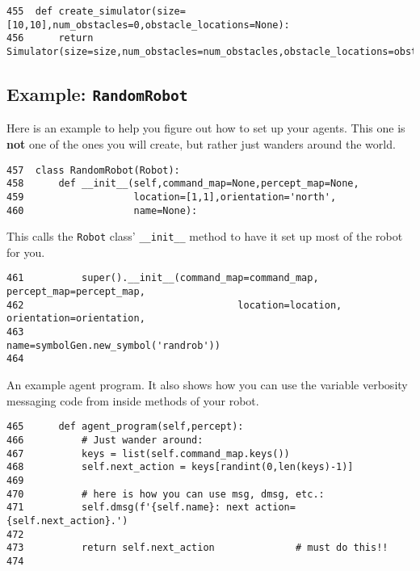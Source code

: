 \documentclass[11pt]{tufte-handout}
\begin{document}
\begin{verbatim}
455  def create_simulator(size=[10,10],num_obstacles=0,obstacle_locations=None):
456      return Simulator(size=size,num_obstacles=num_obstacles,obstacle_locations=obstacle_locations)
\end{verbatim}

\subsection{Example: \texttt{RandomRobot}}
\label{sec:orge412528}

Here is an example to help you figure out how to set up your agents.  This one is \textbf{not} one of the ones you will create, but rather just wanders around the world.

\begin{verbatim}
457  class RandomRobot(Robot):
458      def __init__(self,command_map=None,percept_map=None,
459                   location=[1,1],orientation='north',
460                   name=None):
\end{verbatim}

This calls the \texttt{Robot} class' \texttt{\_\_init\_\_} method to have it set up most of the robot for you.
\begin{verbatim}
461          super().__init__(command_map=command_map, percept_map=percept_map,
462                                     location=location, orientation=orientation,
463                                     name=symbolGen.new_symbol('randrob'))
464  
\end{verbatim}

An example agent program.  It also shows how you can use the variable verbosity messaging code from inside methods of your robot.

\begin{verbatim}
465      def agent_program(self,percept):
466          # Just wander around:
467          keys = list(self.command_map.keys())
468          self.next_action = keys[randint(0,len(keys)-1)]
469  
470          # here is how you can use msg, dmsg, etc.:
471          self.dmsg(f'{self.name}: next action={self.next_action}.')
472  
473          return self.next_action              # must do this!!
474  
\end{verbatim}
\end{document}
